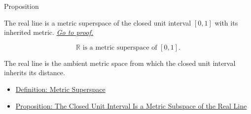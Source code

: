 \begin{propositionbox}{Proposition}
\begin{proposition}
\label{prop:real-line-metric-superspace-closed-unit-interval}
The real line is a metric superspace of the closed unit interval \([0,1]\)
with its inherited metric.
\hyperref[prf:real-line-metric-superspace-closed-unit-interval]{\textit{Go to proof.}}
\end{proposition}
\end{propositionbox}

\begin{remark*}
\[
\mathbb{R}\text{ is a metric superspace of }[0,1].
\]
\end{remark*}

\begin{remark*}[Interpretation]
The real line is the ambient metric space from which the closed unit interval
inherits its distance.
\end{remark*}


\begin{dependencies}
\begin{itemize}
  \item \hyperref[def:metric-superspace]{Definition: Metric Superspace}
  \item \hyperref[prop:closed-unit-interval-metric-subspace]{Proposition: The Closed Unit Interval Is a Metric Subspace of the Real Line}
\end{itemize}
\end{dependencies}
